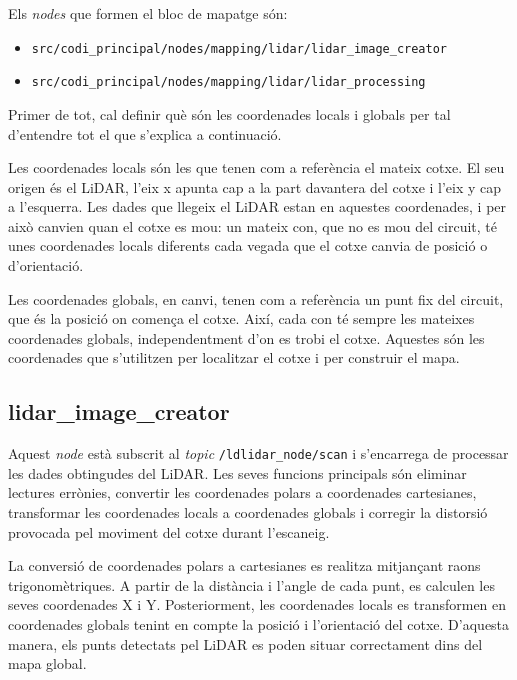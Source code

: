 \documentclass[11pt,a4paper]{article}
\begin{document}
Els \emph{nodes} que formen el bloc de mapatge són:
\nopagebreak

\begin{itemize}
  \item \texttt{src/\allowbreak{}codi\_\allowbreak{}principal/\allowbreak{}nodes/\allowbreak{}mapping/\allowbreak{}lidar/\allowbreak{}lidar\_\allowbreak{}image\_\allowbreak{}creator}
  \item \texttt{src/\allowbreak{}codi\_\allowbreak{}principal/\allowbreak{}nodes/\allowbreak{}mapping/\allowbreak{}lidar/\allowbreak{}lidar\_\allowbreak{}processing}
\end{itemize}

Primer de tot, cal definir què són les coordenades locals i globals per tal d’entendre tot el que s’explica a continuació.

Les coordenades locals són les que tenen com a referència el mateix cotxe. El seu origen és el LiDAR, l’eix x apunta cap a la part davantera del cotxe i l’eix y cap a l’esquerra. Les dades que llegeix el LiDAR estan en aquestes coordenades, i per això canvien quan el cotxe es mou: un mateix con, que no es mou del circuit, té unes coordenades locals diferents cada vegada que el cotxe canvia de posició o d’orientació.

Les coordenades globals, en canvi, tenen com a referència un punt fix del circuit, que és la posició on comença el cotxe. Així, cada con té sempre les mateixes coordenades globals, independentment d’on es trobi el cotxe. Aquestes són les coordenades que s’utilitzen per localitzar el cotxe i per construir el mapa.

\subsection{lidar\_image\_creator}

Aquest \emph{node} està subscrit al \emph{topic} \texttt{/\allowbreak{}ldlidar\_\allowbreak{}node/\allowbreak{}scan} i s’encarrega de processar les dades obtingudes del LiDAR. Les seves funcions principals són eliminar lectures errònies, convertir les coordenades polars a coordenades cartesianes, transformar les coordenades locals a coordenades globals i corregir la distorsió provocada pel moviment del cotxe durant l’escaneig.

La conversió de coordenades polars a cartesianes es realitza mitjançant raons trigonomètriques. A partir de la distància i l’angle de cada punt, es calculen les seves coordenades X i Y. Posteriorment, les coordenades locals es transformen en coordenades globals tenint en compte la posició i l’orientació del cotxe. D’aquesta manera, els punts detectats pel LiDAR es poden situar correctament dins del mapa global.
\end{document}
